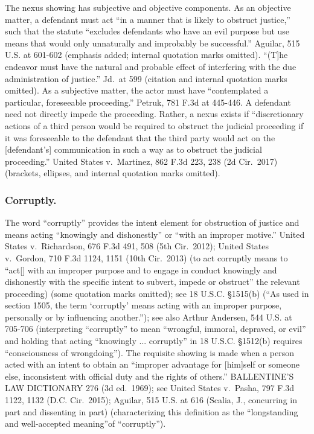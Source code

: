 The nexus showing has subjective and objective components.
As an objective matter, a defendant must act “in a manner that is likely to obstruct justice,” such that the statute “excludes defendants who have an evil purpose but use means that would only unnaturally and improbably be successful.”
Aguilar, 515 U.S. at 601-602 (emphasis added; internal quotation marks omitted).
“(T]he endeavor must have the natural and probable effect of interfering with the due administration of justice.”
Jd.\ at 599 (citation and internal quotation marks omitted).
As a subjective matter, the actor must have “contemplated a particular, foreseeable proceeding.”
Petruk, 781 F.3d at 445-446.
A defendant need not directly impede the proceeding.
Rather, a nexus exists if “discretionary actions of a third person would be required to obstruct the judicial proceeding if it was foreseeable to the defendant that the third party would act on the [defendant’s] communication in such a way as to obstruct the judicial proceeding.”
United States v.\ Martinez, 862 F.3d 223, 238 (2d Cir.~2017) (brackets, ellipses, and internal quotation marks omitted).

\subsubsection*{Corruptly.}
The word “corruptly” provides the intent element for obstruction of justice and means acting “knowingly and dishonestly” or “with an improper motive.”
United States v.\ Richardson, 676 F.3d 491, 508 (5th Cir.~2012);
United States v.\ Gordon, 710 F.3d 1124, 1151 (10th Cir.~2013) (to act corruptly means to “act[] with an improper purpose and to engage in conduct knowingly and dishonestly with the specific intent to subvert, impede or obstruct” the relevant proceeding) (some quotation marks omitted);
see 18 U.S.C. \S 1515(b) (“As used in section 1505, the term ‘corruptly’ means acting with an improper purpose, personally or by influencing another.”);
see also Arthur Andersen, 544 U.S. at 705-706 (interpreting “corruptly” to mean “wrongful, immoral, depraved, or evil” and holding that acting “knowingly ... corruptly” in 18 U.S.C. \S 1512(b) requires “consciousness of wrongdoing”).
The requisite showing is made when a person acted with an intent to obtain an “improper advantage for [him]self or someone else, inconsistent with official duty and the rights of others.”
BALLENTINE’S LAW DICTIONARY 276 (3d ed.~1969);
see United States v.\ Pasha, 797 F.3d 1122, 1132 (D.C. Cir.~2015);
Aguilar, 515 U.S. at 616 (Scalia, J., concurring in part and dissenting in part) (characterizing this definition as the “longstanding and well-accepted meaning”of “corruptly”).

